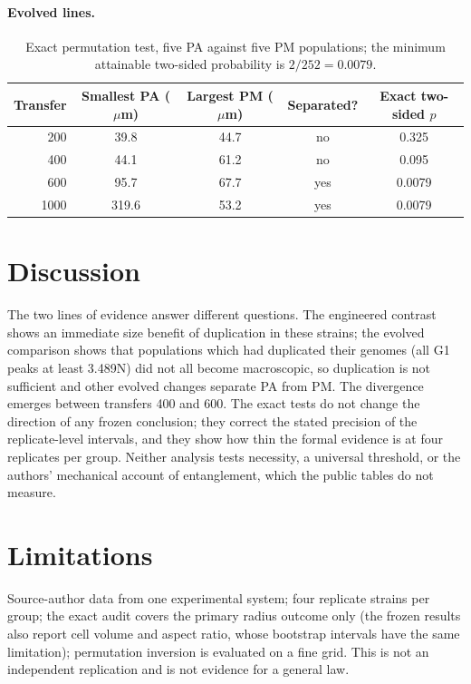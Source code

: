 \documentclass[11pt]{article}
\begin{document}
\paragraph{Evolved lines.}
\begin{table}[h]
\centering\small
\begin{tabular}{rcccc}
\toprule
Transfer & Smallest PA ($\mu$m) & Largest PM ($\mu$m) & Separated? & Exact two-sided $p$\\
\midrule
200 & 39.8 & 44.7 & no & 0.325\\
400 & 44.1 & 61.2 & no & 0.095\\
600 & 95.7 & 67.7 & yes & 0.0079\\
1000 & 319.6 & 53.2 & yes & 0.0079\\
\bottomrule
\end{tabular}
\caption{Exact permutation test, five PA against five PM populations; the minimum attainable two-sided probability is $2/252=0.0079$.}
\end{table}

\section{Discussion}
The two lines of evidence answer different questions. The engineered contrast shows an immediate size benefit of duplication in these
strains; the evolved comparison shows that populations which had duplicated their genomes (all G1 peaks at least 3.489N) did not all
become macroscopic, so duplication is not sufficient and other evolved changes separate PA from PM. The divergence emerges between
transfers 400 and 600. The exact tests do not change the direction of any frozen conclusion; they correct the stated precision of
the replicate-level intervals, and they show how thin the formal evidence is at four replicates per group. Neither analysis tests
necessity, a universal threshold, or the authors' mechanical account of entanglement, which the public tables do not measure.

\section{Limitations}
Source-author data from one experimental system; four replicate strains per group; the exact audit covers the primary radius outcome
only (the frozen results also report cell volume and aspect ratio, whose bootstrap intervals have the same limitation); permutation
inversion is evaluated on a fine grid. This is not an independent replication and is not evidence for a general law.
\end{document}
